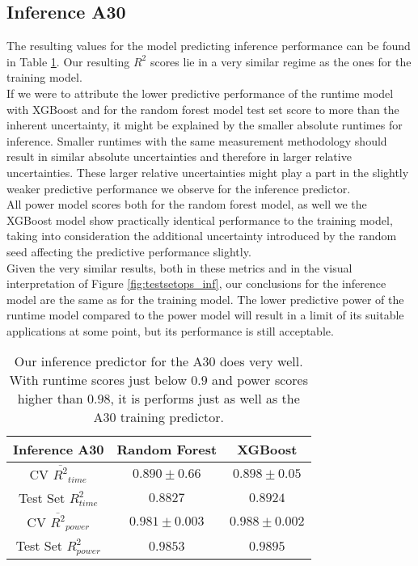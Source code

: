 \subsection{Inference A30}

The resulting values for the model predicting inference performance can be found in Table \ref{tab:pred_res_inf}. Our resulting $R^2$ scores lie in a very similar regime as the ones for the training model. \\
If we were to attribute the lower predictive performance of the runtime model with XGBoost and for the random forest model test set score to more than the inherent uncertainty, it might be explained by the smaller absolute runtimes for inference. Smaller runtimes with the same measurement methodology should result in similar absolute uncertainties and therefore in larger relative uncertainties. These larger relative uncertainties might play a part in the slightly weaker predictive performance we observe for the inference predictor.\\
All power model scores both for the random forest model, as well we the XGBoost model show practically identical performance to the training model, taking into consideration the additional uncertainty introduced by the random seed affecting the predictive performance slightly. \\
Given the very similar results, both in these metrics and in the visual interpretation of Figure \ref{fig:testsetops_inf}, our conclusions for the inference model are the same as for the training model. The lower predictive power of the runtime model compared to the power model will result in a limit of its suitable applications at some point, but its performance is still acceptable. 



\begin{table}[h!]
\centering
\begin{tabular}{|c|c|c|}
\hline
 \textbf{Inference A30}& \textbf{Random Forest} & \textbf{XGBoost} \\
\hline
CV $\overline{R^2}_{time}$ & $0.890 \pm 0.66$ &  $0.898 \pm 0.05$ \\
\hline
Test Set $R^2_{time}$ & $0.8827$ & $0.8924$ \\
\hline
CV $\overline{R^2}_{power}$ & $0.981 \pm 0.003$  &  $0.988 \pm 0.002$\\
\hline
Test Set $R^2_{power}$ & $0.9853$ & $0.9895$ \\
\hline
\end{tabular}
\caption{Our inference predictor for the A30 does very well. With runtime scores just below $0.9$ and power scores higher than $0.98$, it is performs just as well as the A30 training predictor. }
\label{tab:pred_res_inf}
\end{table}



